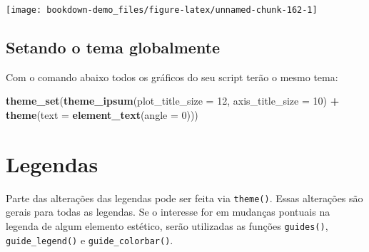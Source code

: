 \documentclass[]{book}
\newenvironment{Shaded}{\begin{snugshade}}{\end{snugshade}}
\newcommand{\KeywordTok}[1]{\textcolor[rgb]{0.13,0.29,0.53}{\textbf{#1}}}
\newcommand{\DataTypeTok}[1]{\textcolor[rgb]{0.13,0.29,0.53}{#1}}
\newcommand{\DecValTok}[1]{\textcolor[rgb]{0.00,0.00,0.81}{#1}}
\newcommand{\StringTok}[1]{\textcolor[rgb]{0.31,0.60,0.02}{#1}}
\newcommand{\OperatorTok}[1]{\textcolor[rgb]{0.81,0.36,0.00}{\textbf{#1}}}
\newcommand{\NormalTok}[1]{#1}
\begin{document}
\begin{center}\texttt{[image: bookdown-demo\_files/figure-latex/unnamed-chunk-162-1]} \end{center}

\subsection{Setando o tema
globalmente}\label{setando-o-tema-globalmente}

Com o comando abaixo todos os gráficos do seu script terão o mesmo tema:

\begin{Shaded}
\begin{Highlighting}[]
\KeywordTok{theme_set}\NormalTok{(}\KeywordTok{theme_ipsum}\NormalTok{(}\DataTypeTok{plot_title_size =} \DecValTok{12}\NormalTok{,}
              \DataTypeTok{axis_title_size =} \DecValTok{10}\NormalTok{) }\OperatorTok{+}
\StringTok{          }\KeywordTok{theme}\NormalTok{(}\DataTypeTok{text =} \KeywordTok{element_text}\NormalTok{(}\DataTypeTok{angle =} \DecValTok{0}\NormalTok{)))}
\end{Highlighting}
\end{Shaded}

\section{Legendas}\label{legendas}

Parte das alterações das legendas pode ser feita via \texttt{theme()}.
Essas alterações são gerais para todas as legendas. Se o interesse for
em mudanças pontuais na legenda de algum elemento estético, serão
utilizadas as funções \texttt{guides()}, \texttt{guide\_legend()} e
\texttt{guide\_colorbar()}.
\end{document}
